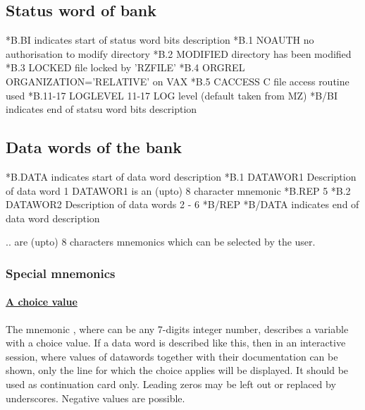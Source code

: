 \subsection{Status word of bank}
 
\begin{XMP}
*B.BI                \lcb indicates start of status word bits description\rcb 
*B.1      NOAUTH     no authorisation to modify directory
*B.2      MODIFIED   directory has been modified
*B.3      LOCKED     file locked by 'RZFILE'
*B.4      ORGREL     ORGANIZATION='RELATIVE' on VAX
*B.5      CACCESS    C file access routine used
*B.11-17  LOGLEVEL   11-17 LOG level (default taken from MZ)
*B/BI                \lcb indicates end of statsu word bits description\rcb 
\end{XMP}
 
\subsection{Data words of the bank}
 
\begin{XMP}
*B.DATA              \lcb indicates start of data word description\rcb 
*B.1      DATAWOR1   Description of data word 1
                     \lcb DATAWOR1 is an (upto) 8 character mnemonic\rcb 
*B.REP    5
*B.2      DATAWOR2   Description of data words 2 - 6
*B/REP
*B/DATA              \lcb indicates end of data word description\rcb 
\end{XMP}
 
 ..  are (upto) 8 characters mnemonics
which can be selected by the user.
 
\subsubsection*{Special mnemonics}
 
\paragraph{\underline{\bf A choice value}}
 
The mnemonic , where  can be any 7-digits integer
number, describes a variable with a choice value. 
If a data word is described like this, 
then in an interactive session, where values of
datawords together with their documentation can be shown,
only the line for which the choice applies will be displayed.
It should be used as continuation card only.
Leading zeros may be left out or replaced by underscores. 
Negative values are possible.
 
